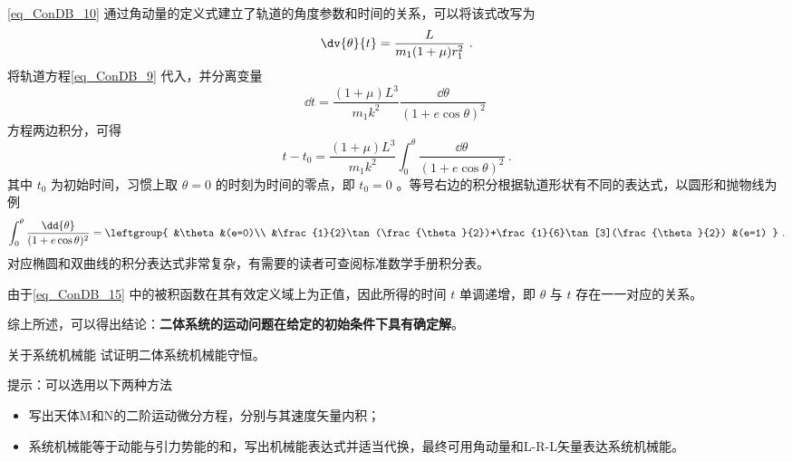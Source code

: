 \autoref{eq_ConDB_10} 通过角动量的定义式建立了轨道的角度参数和时间的关系，可以将该式改写为
\begin{equation}
\dv{\theta}{t}=\frac{L}{ m_1(1+\mu)r_1^2}~.
\end{equation}
将轨道方程\autoref{eq_ConDB_9} 代入，并分离变量
\begin{equation}
\dd{t}=\frac{(1+\mu)L^3}{ m_1k^2}\frac{\dd{\theta}}{(1+e\cos\theta)^2}~
\end{equation}
方程两边积分，可得
\begin{equation}\label{eq_ConDB_15}
t-t_0 = \frac{(1+\mu)L^3}{ m_1k^2}\int_0^{\theta} \frac{\dd{\theta}}{(1+e\cos\theta)^2}~.
\end{equation}
其中 $t_0$ 为初始时间，习惯上取 $\theta=0$ 的时刻为时间的零点，即 $t_0=0$ 。等号右边的积分根据轨道形状有不同的表达式，以圆形和抛物线为例
\begin{equation}
\int_0^{\theta} \frac{\dd{\theta}}{(1+e\cos\theta)^2} =
\leftgroup{
&\theta &(e=0)\\
&\frac{1}{2}\tan(\frac{\theta}{2})+\frac{1}{6}\tan[3](\frac{\theta}{2}) &(e=1)
} ~.
\end{equation}
对应椭圆和双曲线的积分表达式非常复杂，有需要的读者可查阅标准数学手册积分表。

由于\autoref{eq_ConDB_15} 中的被积函数在其有效定义域上为正值，因此所得的时间 $t$ 单调递增，即 $\theta$ 与 $t$ 存在一一对应的关系。

综上所述，可以得出结论：\textbf{二体系统的运动问题在给定的初始条件下具有确定解}。

\begin{exercise}{关于系统机械能}\label{exe_ConDB_1}
试证明二体系统机械能守恒。

提示：可以选用以下两种方法
\begin{itemize}
\item 写出天体M和N的二阶运动微分方程，分别与其速度矢量内积；
\item 系统机械能等于动能与引力势能的和，写出机械能表达式并适当代换，最终可用角动量和L-R-L矢量表达系统机械能。
\end{itemize}
\end{exercise}
